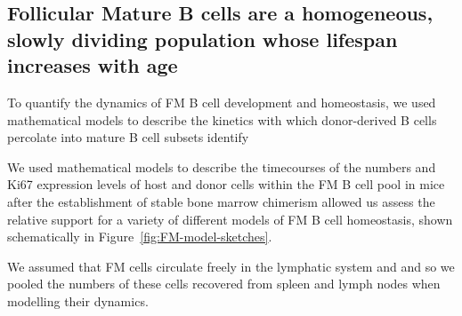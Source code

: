 \documentclass[12pt]{article}
\newcommand{\red}[1]{{\color{red}{#1}}}
\newcommand{\blue}[1]{{\color{blue}{#1}}}
\begin{document}
	



	
	
\subsection*{Follicular Mature B cells are a homogeneous, slowly dividing population whose lifespan increases with age}


To quantify the dynamics of FM B cell development and homeostasis, we used mathematical models to describe the kinetics with which donor-derived B cells percolate into mature B cell subsets identify
 
We used mathematical models to describe the timecourses of the numbers and Ki67 expression levels of   host and donor cells within the FM B cell pool in mice after the establishment of stable bone marrow chimerism allowed us assess the relative support for a variety of different models of FM B cell homeostasis, shown schematically in Figure~\ref{fig:FM-model-sketches}. 

We assumed that FM cells circulate freely in the lymphatic system \red{CITE} and \red{\bf  indeed found no differences in the levels of Ki67 expression or kinetics of development of donor:host chimerism in FM cells in spleen and lymph nodes (SI figures)} \blue{Though this recaps Fig 2 to a degree}   and so we pooled the numbers of these cells recovered from spleen and lymph nodes when modelling their dynamics.
\end{document}
